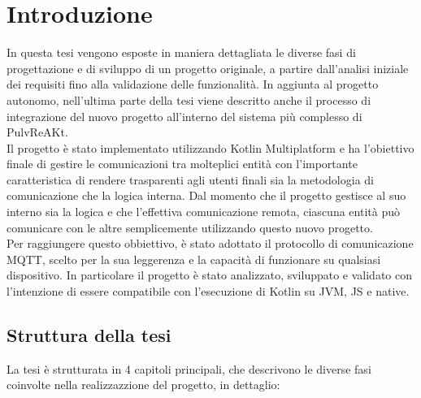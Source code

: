 \documentclass[12pt,a4paper,openright,twoside]{book}
\begin{document}
\tableofcontents
\listoffigures

\mainmatter

\chapter{Introduzione}\label{chap:Introduzione}

In questa tesi vengono esposte in maniera dettagliata le diverse fasi di progettazione e di sviluppo di un progetto originale, 
a partire dall'analisi iniziale dei requisiti fino alla validazione delle funzionalità. In aggiunta al progetto autonomo, 
nell'ultima parte della tesi viene descritto anche il processo di integrazione del nuovo progetto all'interno del sistema più complesso di PulvReAKt.\\
Il progetto è stato implementato utilizzando Kotlin Multiplatform e ha l’obiettivo finale di gestire
le comunicazioni tra molteplici entità con l'importante caratteristica di rendere trasparenti agli utenti finali sia la metodologia
di comunicazione che la logica interna. Dal momento che il progetto gestisce al suo interno sia
la logica e che l’effettiva comunicazione remota, ciascuna entità può comunicare
con le altre semplicemente utilizzando questo nuovo progetto.\\
Per raggiungere questo obbiettivo, è stato adottato il protocollo di comunicazione \acf{MQTT}, scelto per la sua leggerenza e la capacità di funzionare su qualsiasi dispositivo.
In particolare il progetto è stato analizzato, sviluppato e validato con l'intenzione di essere compatibile con l'esecuzione di Kotlin su \acf{JVM}, \acf{JS} e native.
\pagebreak
\section{Struttura della tesi}
La tesi è strutturata in 4 capitoli principali, che descrivono le diverse fasi coinvolte nella realizzazzione del progetto, in dettaglio:
\end{document}
